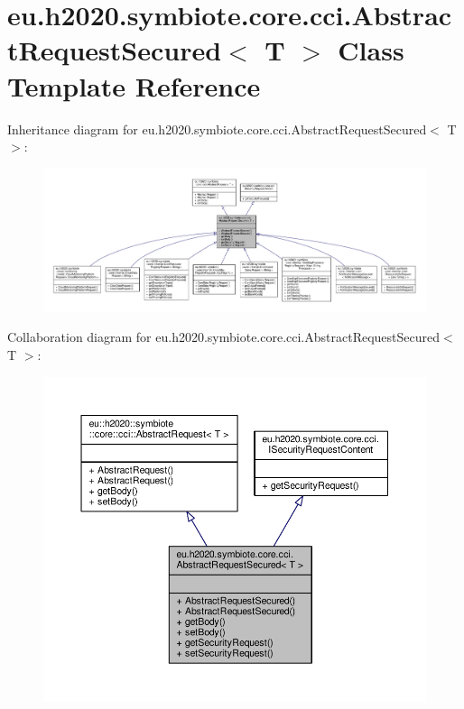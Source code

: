 \hypertarget{classeu_1_1h2020_1_1symbiote_1_1core_1_1cci_1_1AbstractRequestSecured}{}\section{eu.\+h2020.\+symbiote.\+core.\+cci.\+Abstract\+Request\+Secured$<$ T $>$ Class Template Reference}
\label{classeu_1_1h2020_1_1symbiote_1_1core_1_1cci_1_1AbstractRequestSecured}


Inheritance diagram for eu.\+h2020.\+symbiote.\+core.\+cci.\+Abstract\+Request\+Secured$<$ T $>$\+:
\nopagebreak
\begin{figure}[H]
\begin{center}
\leavevmode
\includegraphics[width=350pt]{classeu_1_1h2020_1_1symbiote_1_1core_1_1cci_1_1AbstractRequestSecured__inherit__graph}
\end{center}
\end{figure}


Collaboration diagram for eu.\+h2020.\+symbiote.\+core.\+cci.\+Abstract\+Request\+Secured$<$ T $>$\+:\nopagebreak
\begin{figure}[H]
\begin{center}
\leavevmode
\includegraphics[width=350pt]{classeu_1_1h2020_1_1symbiote_1_1core_1_1cci_1_1AbstractRequestSecured__coll__graph}
\end{center}
\end{figure}
